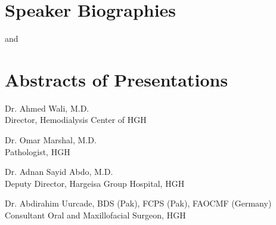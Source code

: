 \documentclass{article}
\begin{document}
\section*{Speaker Biographies}
and

\section*{Abstracts of Presentations}
\clearpage


Dr. Ahmed Wali, M.D.\\
Director, Hemodialysis Center of HGH
%
%
\clearpage


%
\clearpage


%
\clearpage

Dr. Omar Marshal, M.D.\\
Pathologist, HGH
%
%
\clearpage

Dr. Adnan Sayid Abdo, M.D.\\
Deputy Director, Hargeisa Group Hospital, HGH
%
%
\clearpage


%
\clearpage

Dr. Abdirahim Uurcade, BDS (Pak), FCPS (Pak), FAOCMF (Germany) \\
Consultant Oral and Maxillofacial Surgeon, HGH

%
%
\clearpage





\clearpage
\end{document}
